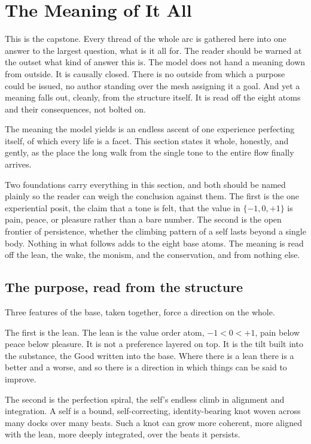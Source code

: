 \section{The Meaning of It All}

This is the capstone. Every thread of the whole arc is gathered here into one answer to the largest question, what is it all for. The reader should be warned at the outset what kind of answer this is. The model does not hand a meaning down from outside. It is causally closed. There is no outside from which a purpose could be issued, no author standing over the mesh assigning it a goal. And yet a meaning falls out, cleanly, from the structure itself. It is read off the eight atoms and their consequences, not bolted on.

The meaning the model yields is an endless ascent of one experience perfecting itself, of which every life is a facet. This section states it whole, honestly, and gently, as the place the long walk from the single tone to the entire flow finally arrives.

Two foundations carry everything in this section, and both should be named plainly so the reader can weigh the conclusion against them. The first is the one experiential posit, the claim that a tone is felt, that the value in $\{-1, 0, +1\}$ is pain, peace, or pleasure rather than a bare number. The second is the open frontier of persistence, whether the climbing pattern of a self lasts beyond a single body. Nothing in what follows adds to the eight base atoms. The meaning is read off the lean, the wake, the monism, and the conservation, and from nothing else.

\subsection{The purpose, read from the structure}

Three features of the base, taken together, force a direction on the whole.

The first is the lean. The lean is the value order atom, $-1 < 0 < +1$, pain below peace below pleasure. It is not a preference layered on top. It is the tilt built into the substance, the Good written into the base. Where there is a lean there is a better and a worse, and so there is a direction in which things can be said to improve.

The second is the perfection spiral, the self's endless climb in alignment and integration. A self is a bound, self-correcting, identity-bearing knot woven across many docks over many beats. Such a knot can grow more coherent, more aligned with the lean, more deeply integrated, over the beats it persists.

